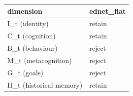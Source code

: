 \begin{tabular}{ll}
\toprule
dimension & ednet\_flat \\
\midrule
I\_t (identity) & retain \\
C\_t (cognition) & retain \\
B\_t (behaviour) & reject \\
M\_t (metacognition) & reject \\
G\_t (goals) & reject \\
H\_t (historical memory) & retain \\
\bottomrule
\end{tabular}
